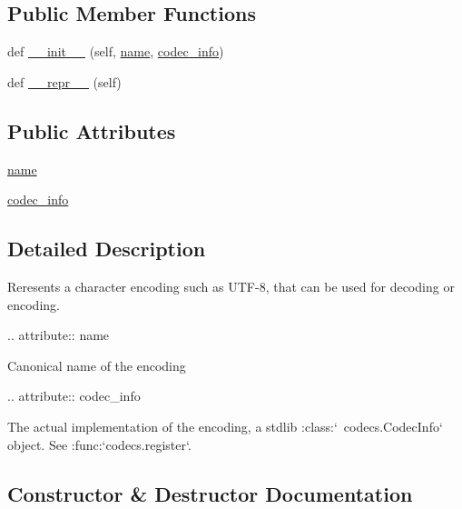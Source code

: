 \subsection*{Public Member Functions}
\begin{DoxyCompactItemize}
\item 
def \hyperlink{classpip_1_1__vendor_1_1webencodings_1_1Encoding_a686e5574331cbf87303080022fa8480b}{\+\_\+\+\_\+init\+\_\+\+\_\+} (self, \hyperlink{classpip_1_1__vendor_1_1webencodings_1_1Encoding_a1fbc38c589878156cf9524fe640c1787}{name}, \hyperlink{classpip_1_1__vendor_1_1webencodings_1_1Encoding_afa918b975b8c3135ba74c8667fbbefac}{codec\+\_\+info})
\item 
def \hyperlink{classpip_1_1__vendor_1_1webencodings_1_1Encoding_a22472b135ce26e820e1cdda397151520}{\+\_\+\+\_\+repr\+\_\+\+\_\+} (self)
\end{DoxyCompactItemize}
\subsection*{Public Attributes}
\begin{DoxyCompactItemize}
\item 
\hyperlink{classpip_1_1__vendor_1_1webencodings_1_1Encoding_a1fbc38c589878156cf9524fe640c1787}{name}
\item 
\hyperlink{classpip_1_1__vendor_1_1webencodings_1_1Encoding_afa918b975b8c3135ba74c8667fbbefac}{codec\+\_\+info}
\end{DoxyCompactItemize}


\subsection{Detailed Description}
\begin{DoxyVerb}Reresents a character encoding such as UTF-8,
that can be used for decoding or encoding.

.. attribute:: name

    Canonical name of the encoding

.. attribute:: codec_info

    The actual implementation of the encoding,
    a stdlib :class:`~codecs.CodecInfo` object.
    See :func:`codecs.register`.\end{DoxyVerb}
 

\subsection{Constructor \& Destructor Documentation}
\mbox{\label{classpip_1_1__vendor_1_1webencodings_1_1Encoding_a686e5574331cbf87303080022fa8480b}} 
